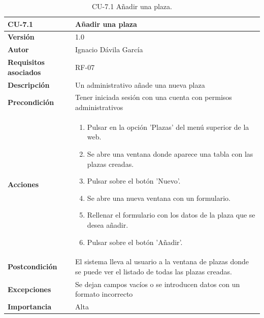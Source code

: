 \begin{table}[p]
	\centering
	\begin{tabularx}{\linewidth}{ p{} p{} }
		\toprule
		\textbf{CU-7.1}    & \textbf{Añadir una plaza}\\
		\toprule
		\textbf{Versión}              & 1.0    \\
		\textbf{Autor}                & Ignacio Dávila García \\
		\textbf{Requisitos asociados} & RF-07 \\
		\textbf{Descripción}          & Un administrativo añade una nueva plaza \\
		\textbf{Precondición}         & Tener iniciada sesión con una cuenta con permisos administrativos \\
		\textbf{Acciones}             &
		\begin{enumerate}
			\def\labelenumi{\arabic{enumi}.}
			\tightlist
			\item Pulsar en la opción 'Plazas' del menú superior de la web.
			\item Se abre una ventana donde aparece una tabla con las plazas creadas.
			\item Pulsar sobre el botón 'Nuevo'.
			\item Se abre una nueva ventana con un formulario.
			\item Rellenar el formulario con los datos de la plaza que se desea añadir.
			\item Pulsar sobre el botón 'Añadir'.
		\end{enumerate}\\
		\textbf{Postcondición}        & El sistema lleva al usuario a la ventana de plazas donde se puede ver el listado de todas las plazas creadas. \\
		\textbf{Excepciones}          & Se dejan campos vacíos o se introducen datos con un formato incorrecto \\
		\textbf{Importancia}          & Alta \\
		\bottomrule
	\end{tabularx}
	\caption{CU-7.1 Añadir una plaza.}
\end{table}

